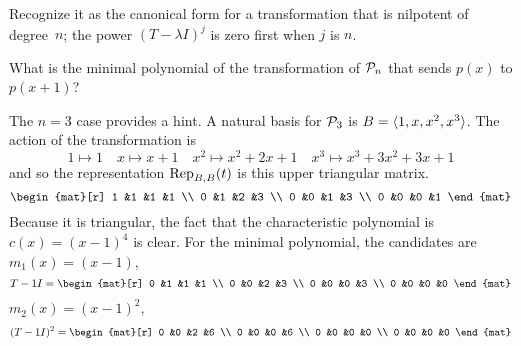 \begin{exercises}
\begin{answer}
\begin{equation*}
      \end{equation*}
      Recognize it as the canonical form for a transformation that is 
      nilpotent of degree~$n$; the power $(T-\lambda I)^j$ is zero first
      when $j$ is $n$.
    \end{answer}
  \item 
    What is the minimal polynomial of the transformation of
    \( \polyspace_n \) that sends \( p(x) \) to \( p(x+1) \)?
    \begin{answer}
      The $n=3$ case provides a hint.
      A natural basis for $\polyspace_3$ is  
      $B=\sequence{1,x,x^2,x^3}$.
      The action of the transformation is
      \begin{equation*}
        1\mapsto 1
        \quad
        x\mapsto x+1
        \quad
        x^2\mapsto x^2+2x+1
        \quad
        x^3\mapsto x^3+3x^2+3x+1
      \end{equation*}
      and so the representation $\rep{t}{B,B}$ is this upper triangular matrix.
      \begin{equation*}
        \begin{mat}[r]
          1  &1  &1  &1  \\
          0  &1  &2  &3  \\
          0  &0  &1  &3  \\
          0  &0  &0  &1
        \end{mat}
      \end{equation*}
      Because it is triangular, the fact that the characteristic polynomial is
      $c(x)=(x-1)^4$ is clear.
      For the minimal polynomial, the candidates are $m_1(x)=(x-1)$,
      \begin{equation*}
        T-1I=
        \begin{mat}[r]
          0  &1  &1  &1  \\
          0  &0  &2  &3  \\
          0  &0  &0  &3  \\
          0  &0  &0  &0
        \end{mat}
      \end{equation*}
      $m_2(x)=(x-1)^2$, 
      \begin{equation*}
        (T-1I)^2=
        \begin{mat}[r]
          0  &0  &2  &6  \\
          0  &0  &0  &6  \\
          0  &0  &0  &0  \\
          0  &0  &0  &0
        \end{mat}

\end{equation*}
\end{answer}
\end{exercises}
